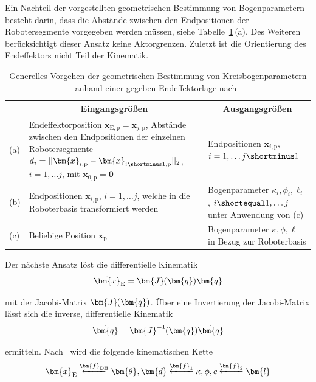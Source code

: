 Ein Nachteil der vorgestellten geometrischen Bestimmung von Bogenparametern besteht darin, dass die Abstände zwischen den Endpositionen der Robotersegmente vorgegeben werden müssen, siehe Tabelle~\ref{tab:geometrischeInverseUnabhaengigeKinematik}\,(a). Des Weiteren berücksichtigt dieser Ansatz keine Aktorgrenzen. Zuletzt ist die Orientierung des Endeffektors nicht Teil der Kinematik. 
\begin{table}[htb!]
\caption[Generelles Vorgehen der geometrischen Bestimmung von Kreisbogenparametern]
{Generelles Vorgehen der geometrischen Bestimmung von Kreisbogenparametern anhand einer gegeben Endeffektorlage nach~\cite{NCJW09}}
\begin{tabular}{ l  p{7.5cm} | p{6.50cm}}
\label{tab:geometrischeInverseUnabhaengigeKinematik}	
& \multicolumn{1}{c}{Eingangsgrößen} & \multicolumn{1}{c}{Ausgangsgrößen}\\ \hline\hline
(a) & Endeffektorposition $\bm{x}_{\mathrm{E,p}} = \bm{x}_{j,\mathrm{p}}$, Abstände zwischen den Endpositionen der einzelnen Robotersegmente \mbox{$d_i = ||\bm{x}_{i,\mathrm{p}}-\bm{x}_{i\shortminus1,\mathrm{p}}||_2$,} \mbox{$i = 1, \dots j $}, mit $\bm{x}_{0,\mathrm{p}} = \bm{0}$ & Endpositionen $\bm{x}_{i,\mathrm{p}}$, $i = 1,\dots j \shortminus 1$ \\ \hline
(b) & Endpositionen $\bm{x}_{i,\mathrm{p}}$, $i = 1, \dots j$, welche in die Roboterbasis transformiert werden &  Bogenparameter $\kappa_i, \phi_i, \ell_i$, $i \shortequal 1,  \dots j$ unter Anwendung von (c)  \\ \hline
(c) & Beliebige Position $\bm{x}_{\mathrm{p}}$ &  Bogenparameter $\kappa, \phi, \ell$ in Bezug zur Roboterbasis \\ 
\end{tabular}
\end{table}

Der nächste Ansatz löst die differentielle Kinematik
\begin{align}
\dot{\bm{x}}_{\mathrm{E}} = \bm{J} \mkern-1mu( \bm{q} ) \bm{q}
\label{eq:differentielle_kinematik}
\end{align}

mit der Jacobi-Matrix $\bm{J}\mkern-1mu (\bm{q})$. Über eine Invertierung der Jacobi-Matrix lässt sich die inverse, differentielle Kinematik 
\begin{align}
\dot{\bm{q}} = \bm{J}^{-1} \mkern-1mu( \bm{q} ) \dot{\bm{q}}
\label{eq:differentielleinverse_kinematik}
\end{align}

ermitteln. Nach~\cite{JW06} wird die folgende kinematischen Kette
\begin{align}
\bm{x}_{\mathrm{E}} 
\stackrel{\bm{f}_{\mathrm{DH}}}{\parbox{1cm}{\leftarrowfill}} \bm{\theta}, \bm{d}
\stackrel{\bm{f}_1}{\parbox{1cm}{\leftarrowfill}} \kappa, \phi, c
\stackrel{\bm{f}_2}{\parbox{1cm}{\leftarrowfill}} \bm{l}
\label{eq:informationsfluss_jones_walker}
\end{align}

